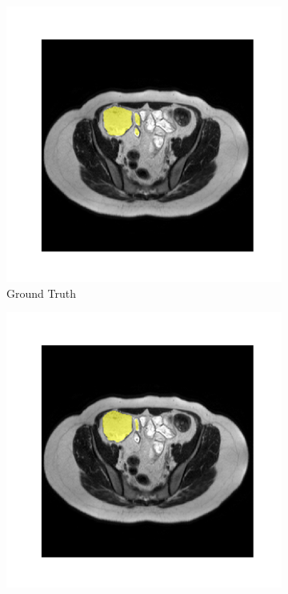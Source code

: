 \begin{figure}[H]
\centering
\begin{subfigure}[b]{0.47\textwidth}
\centering
\includegraphics[width=\textwidth]{./figures/ablation_gt.png}
\caption{Ground Truth}
\label{fig:1}
\end{subfigure}
\hfill
\begin{subfigure}[b]{0.47\textwidth}
\centering
\includegraphics[width=\textwidth]{./figures/ablation_medsam.png}

\end{subfigure}
\end{figure}
